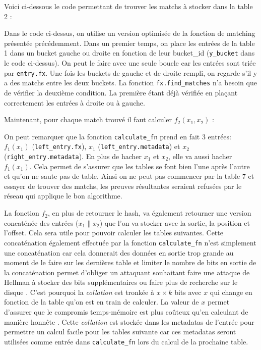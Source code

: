 Voici ci-dessous le code permettant de trouver les matchs à stocker dans la table 2 :


Dans le code ci-dessus, on utilise un version optimisée de la fonction de matching présentée précédemment. Dans un premier temps, on place les entrées de la table 1 dans un bucket gauche ou droite en fonction de leur bucket\_id (\verb|y_bucket| dans le code ci-dessus). On peut le faire avec une seule boucle car les entrées sont triée par \verb|entry.fx|. Une fois les buckets de gauche et de droite rempli, on regarde s'il y a des matchs entre les deux buckets. La fonction \verb|fx.find_matches| n'a besoin que de vérifier la deuxième condition. La première étant déjà vérifiée en plaçant correctement les entrées à droite ou à gauche.

Maintenant, pour chaque match trouvé il faut calculer $f_2(x_1,x_2)$ :


On peut remarquer que la fonction \verb|calculate_fn| prend en fait 3 entrées: $f_1(x_1)$ (\verb|left_entry.fx|), $x_1$ (\verb|left_entry.metadata|) et $x_2$ (\verb|right_entry.metadata|). En plus de hacher $x_1$ et $x_2$, elle va aussi hacher $f_1(x_1)$. Cela permet de s'assurer que les tables se font bien l'une après l'autre et qu'on ne saute pas de table. Ainsi on ne peut pas commencer par la table 7 et essayer de trouver des matchs, les preuves résultantes seraient refusées par le réseau qui applique le bon algorithme.

La fonction $f_2$, en plus de retourner le hash, va également retourner une version concaténée des entrées ($x_1\|x_2$) que l'on va stocker avec la sortie, la position et l'offset. Cela sera utile pour pouvoir calculer les tables suivantes. Cette concaténation également effectuée par la fonction \verb|calculate_fn| n'est simplement une concaténation car cela donnerait des données en sortie trop grande au moment de le faire sur les dernières table et limiter le nombre de bits en sortie de la concaténation permet d'obliger un attaquant souhaitant faire une attaque de Hellman à stocker des bits supplémentaires ou faire plus de recherche sur le disque \cite{chia:construction}. C'est pourquoi la \emph{collation} est tronkée à $x \times k$ bits avec $x$ qui change en fonction de la table qu'on est en train de calculer. La valeur de $x$ permet d'assurer que le compromis temps-mémoire est plus coûteux qu'en calculant de manière honnête \cite{chia:construction}. Cette \emph{collation} est stockée dans les metadatas de l'entrée pour permettre un calcul facile pour les tables suivante car ces metadatas seront utilisées comme entrée dans \verb|calculate_fn| lors du calcul de la prochaine table.

